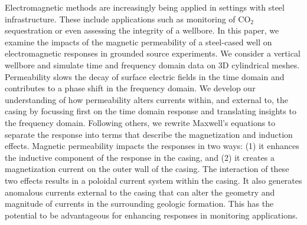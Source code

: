 Electromagnetic methods are increasingly being applied in settings with steel infrastructure. These include applications such as monitoring of CO$_2$ sequestration or even assessing the integrity of a wellbore. In this paper, we examine the impacts of the magnetic permeability of a steel-cased well on electromagnetic responses in grounded source experiments. We consider a vertical wellbore and simulate time and frequency domain data on 3D cylindrical meshes. Permeability slows the decay of surface electric fields in the time domain and contributes to a phase shift in the frequency domain. We develop our understanding of how permeability alters currents within, and external to, the casing by focussing first on the time domain response and translating insights to the frequency domain. Following others, we rewrite Maxwell's equations to separate the response into terms that describe the magnetization and induction effects. Magnetic permeability impacts the responses in two ways: (1) it enhances the inductive component of the response in the casing, and (2) it creates a magnetization current on the outer wall of the casing. The interaction of these two effects results in a poloidal current system within the casing. It also generates anomalous currents external to the casing that can alter the geometry and magnitude of currents in the surrounding geologic formation. This has the potential to be advantageous for enhancing responses in monitoring applications.
